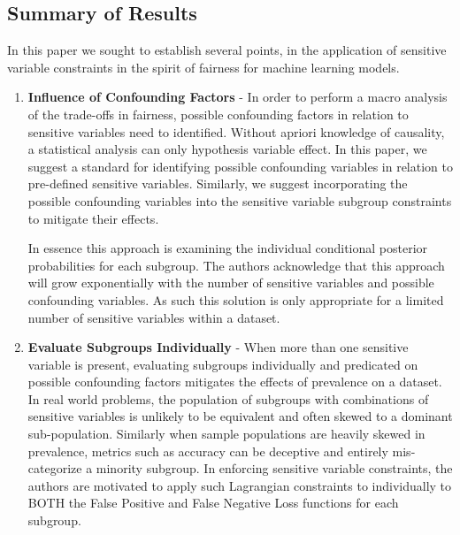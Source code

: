 \subsection{Summary of Results}
	In this paper we sought to establish several points, in the application of sensitive variable constraints in the spirit of fairness for  machine learning models. 
\begin{enumerate}
	\item \textbf{Influence of Confounding Factors} - In order to perform a macro analysis of the trade-offs in fairness, possible confounding factors in relation to sensitive variables need to identified.  Without apriori knowledge of causality, a statistical analysis can only hypothesis variable effect.  In this paper, we suggest a standard for identifying possible confounding variables in relation to pre-defined sensitive variables. Similarly, we suggest incorporating the possible confounding variables into the sensitive variable subgroup constraints to mitigate their effects.  \par
    	In essence this approach is examining the individual conditional posterior probabilities for each subgroup.  The authors acknowledge that this approach will grow exponentially with the number of sensitive variables and possible confounding variables. As such this solution is only appropriate for a limited number of sensitive variables within a dataset. \par
    
    \item \textbf{Evaluate Subgroups Individually} - When more than one sensitive variable is present, evaluating subgroups individually and predicated on possible confounding factors mitigates the effects of prevalence on a dataset.  In real world problems, the population of subgroups with combinations of sensitive variables is unlikely to be equivalent and often skewed to a dominant sub-population. Similarly when sample populations are heavily skewed in prevalence, metrics such as accuracy can be deceptive and entirely mis-categorize a minority subgroup. In enforcing sensitive variable constraints, the authors are motivated to apply such Lagrangian constraints to individually to BOTH the False Positive and False Negative Loss functions for each subgroup.  
    

\end{enumerate}
